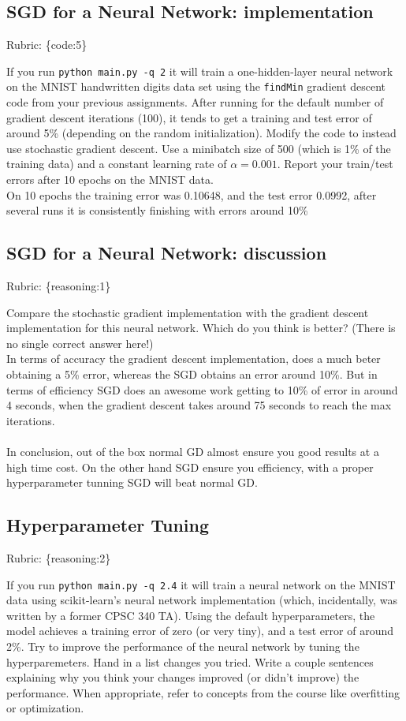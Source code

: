 \documentclass{article}
\def\rubric#1{\gre{Rubric: \{#1\}}}{}
\def\blu#1{{\color{blu}#1}}
\def\gre#1{{\color{gre}#1}}
\def\ans#1{{\color{ans}#1}}
\begin{document}
\subsection{SGD for a Neural Network: implementation}
\rubric{code:5}


If you run \texttt{python main.py -q 2} it will train a one-hidden-layer neural network on the MNIST handwritten digits data set using the \texttt{findMin} gradient descent code from your previous assignments. After running for the default number of gradient descent iterations (100), it tends to get a training and test error of around 5\% (depending on the random initialization). 
\blu{Modify the code to instead use stochastic gradient descent. Use a minibatch size of 500 (which is 1\% of the training data) and a constant learning rate of $\alpha=0.001$. Report your train/test errors after 10 epochs on the MNIST data.}  \\
\ans{
    On 10 epochs the training error was 0.10648, and the test error 0.0992, after several runs it is 
    consistently finishing with errors around 10\%
}

\subsection{SGD for a Neural Network: discussion}
\rubric{reasoning:1}

Compare the stochastic gradient implementation with the gradient descent implementation for this neural network. Which do you think is better? (There is no single correct answer here!) \\
\ans{
    In terms of accuracy the gradient descent implementation, does a much beter obtaining a 5\% error, 
    whereas the SGD obtains an error around 10\%. But in terms of efficiency SGD does an awesome work 
    getting to 10\% of error in around 4 seconds, when the gradient descent takes around 75 seconds to 
    reach the max iterations. \\ \\
    In conclusion, out of the box normal GD almost ensure you good results at a high time 
    cost. On the other hand SGD ensure you efficiency, with a proper hyperparameter tunning SGD will 
    beat normal GD.
}

\subsection{Hyperparameter Tuning}
\rubric{reasoning:2}

If you run \texttt{python main.py -q 2.4} it will train a neural network on the MNIST data using scikit-learn's neural network implementation (which, incidentally, was written by a former CPSC 340 TA).
Using the default hyperparameters, the model achieves a training error of zero (or very tiny), and a test error of around 2\%. 
Try to improve the performance of the neural network by tuning the hyperparemeters.
\blu{Hand in a list changes you tried. Write a couple sentences explaining why you think your changes improved (or didn't improve) the performance. When appropriate, refer to concepts from the course like overfitting or optimization.}
\end{document}
